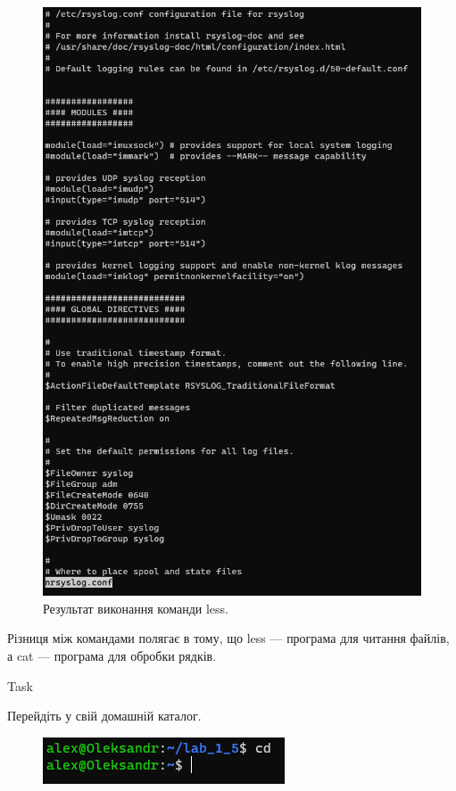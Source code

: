 \documentclass[a4paper,12pt]{article}
\newcommand{\RomanNumeralCaps}[1]{\MakeUppercase{\romannumeral #1}}
\begin{document}
\newpage
    \begin{figure}[h!]
        \begin{minipage}[h]{1\linewidth}
            \centering
            \includegraphics[width=0.6\linewidth]{Prt sc/Figure_17.png}  
        \end{minipage}
        \caption{Результат виконання команди less.}
    \end{figure}
    Різниця між командами полягає в тому, що less — програма для читання файлів, 
    а cat — програма для обробки рядків.

    \begin{center}
        \Large{Task \RomanNumeralCaps{17}}
    \end{center}
    Перейдіть у свій домашній каталог.
    \begin{figure}[h!]
        \begin{minipage}[h]{1\linewidth}
            \centering
            \includegraphics[width=0.6\linewidth]{Prt sc/Figure_18.png}  
        \end{minipage}
    \end{figure}
\end{document}
